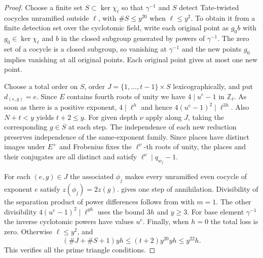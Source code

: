 \begin{proof}
Choose a finite set $S\subset\ker\chi_\ell$ so that $\gamma^{-1}$ and $S$ detect Tate-twisted cocycles unramified outside $\ell$, with $\#S\le y^{20}$ when $\ell\le y^2$. To obtain it from a finite detection set over the cyclotomic field, write each original point as $g_0 b$ with $g_0\in\ker\chi_\ell$ and $b$ in the closed subgroup generated by powers of $\gamma^{-1}$. The zero set of a cocycle is a closed subgroup, so vanishing at $\gamma^{-1}$ and the new points $g_0$ implies vanishing at all original points. Each original point gives at most one new point.

Choose a total order on $S$, order $J=\{1,\ldots,t-1\}\times S$ lexicographically, and put $d_{(e,g)}=e$. Since $E$ contains fourth roots of unity we have $4\mid u^e-1$ in $\mathbb Z_\ell$. As soon as there is a positive exponent, $4\mid\ell^h$ and hence $4(u^e-1)^2\mid\ell^{3h}$. Also $N+t<y$ yields $t+2\le y$. For given depth $\nu$ apply  along $J$, taking the corresponding $g\in S$ at each step. The independence of each new reduction preserves independence of the same-exponent family. Since places have distinct images under $E^+$ and Frobenius fixes the $\ell^\nu$-th roots of unity, the places and their conjugates are all distinct and satisfy $\ell^\nu\mid q_{w_j}-1$.

For each $(e,g)\in J$ the associated $\phi_j$ makes every unramified even cocycle of exponent $e$ satisfy $z(\phi_j)=2z(g)$.  gives one step of annihilation. Divisibility of the separation product of power differences follows from  with $m=1$. The other divisibility $4(u^e-1)^2\mid\ell^{yh}$ uses the bound $3h$ and $y\ge3$. For base element $\gamma^{-1}$ the inverse cyclotomic powers have values $u^e$. Finally, when $h=0$ the total loss is zero. Otherwise $\ell\le y^2$, and
\[
 (\#J+\#S+1)yh\le (t+2)y^{20}yh\le y^{22}h.
\]
This verifies all the prime triangle conditions.
\end{proof}

